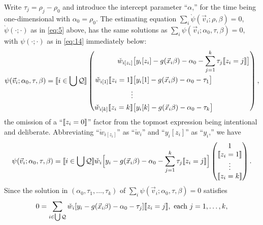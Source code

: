 \documentclass{article}
\DeclarePairedDelimiter{\indicator}{\llbracket}{\rrbracket}
\newcommand{\owt}[1][{[z_{i}]}]{\ensuremath{\check{w}_{i#1}}}
\begin{document}
Write $\tau_{j}=\rho_{j}-\rho_{0}$ and introduce the intercept parameter ``$\alpha$,''  for the time being one-dimensional with $\alpha_{0}=\rho_{0}$.   The estimating equation $\sum_{i}\grave{\psi}(\vec{v}_{i}; \rho, \beta)=0$,
$\grave{\psi}(\cdot; \cdot)$ as in \eqref{eq:5} above, has the same solutions as $\sum_{i}\psi(\vec{v}_{i};
  \alpha_{0}, \tau, \beta)=0$, with $\psi(\cdot; \cdot)$ as in \eqref{eq:14} immediately below:
\begin{equation} \label{eq:14}
         \psi(\vec{v}_{i};
         \alpha_{0}, \tau, \beta) =
         \indicator{i \in \bigcup \mathcal{Q}}
         \left( \begin{aligned}
           \owt[{[z_{i}]}] &\big[y_{i}[z_{i}] - g(\vec{x}_{i}\beta)-
                  \alpha_{0} - \sum_{j=1}^{k}\tau_{j}\indicator{z_{i}=j}\big]\\
           \owt[{[1]}]\indicator{z_{i}=1} & \big[y_{i}[1] - g(\vec{x}_{i}\beta)-
                  \alpha_{0}-\tau_{1}\big]\\
                  \vdots \\
           \owt[{[k]}]\indicator{z_{i}=k} & \big[y_{i}[k] - g(\vec{x}_{i}\beta)-
                 \alpha_{0} - \tau_{k}\big]\\
                \end{aligned}\right),
\end{equation}
the omission of a ``$\indicator{z_{i}=0}$'' factor from the topmost
expression being intentional and deliberate.
Abbreviating ``$\owt{}$'' as ``$\owt[]$'' and ``$y_{i}[z_{i}]$'' as
``$y_{i}$,'' we have
\begin{equation}\label{eq:27}
         \psi(\vec{v}_{i};
         \alpha_{0}, \tau, \beta) =
         \indicator{i \in \bigcup \mathcal{Q}}
  \owt[] \Big[y_{i} - g(\vec{x}_{i}\beta)-
                  \alpha_{0} -
                  \sum_{j=1}^{k}\tau_{j}\indicator{z_{i}=j}\Big]
                  \begin{pmatrix} 1 \\ \indicator{z_{i}=1}\\ \vdots
                    \\ \indicator{z_{i}=k}\end{pmatrix} .
\end{equation}
Since the solution in
$(\alpha_{0}, \tau_{1}, \ldots, \tau_{k})$ of
$\sum_{i}\psi(\vec{v}_{i}; \alpha_{0}, \tau, \beta) =0$ satisfies
\begin{equation} \label{eq:16}
       0 = \sum_{i \in \bigcup \mathcal{Q}}\owt[][y_{i} - g(\vec{x}_{i}\beta)-
                  \alpha_{0}-\tau_{j}]\indicator{z_{i}=j}, \text{ each } j=1, \ldots, k,
\end{equation}
\end{document}

